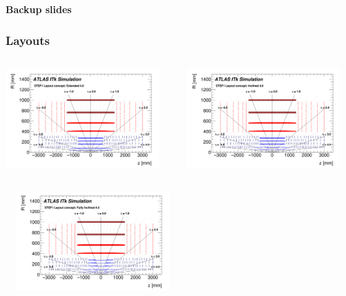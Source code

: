 \documentclass{beamer}
\begin{document}
\begin{frame}
\centering
\huge \color{dred} \textbf{Backup slides}
\end{frame}

\begin{frame}
\frametitle{Layouts}
\begin{columns}
\begin{column}{0.5\textwidth}
\includegraphics[width=\textwidth,height=3.8cm]{ExtBrl4}
\end{column}
\begin{column}{0.5\textwidth}
\includegraphics[width=\textwidth,height=3.8cm]{IExtBrl4}
\end{column}
\end{columns}

\begin{center}
\includegraphics[width=0.5\textwidth,height=3.8cm]{InclBrl4}
\end{center}

\end{frame}
\end{document}
